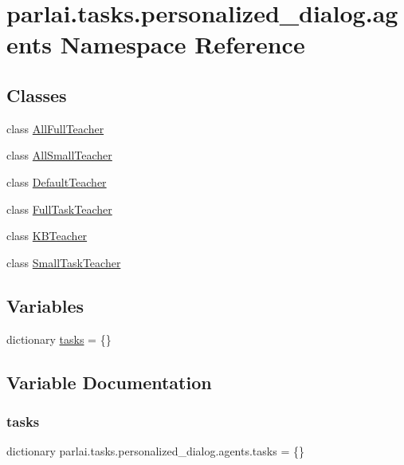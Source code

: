 \hypertarget{namespaceparlai_1_1tasks_1_1personalized__dialog_1_1agents}{}\section{parlai.\+tasks.\+personalized\+\_\+dialog.\+agents Namespace Reference}
\label{namespaceparlai_1_1tasks_1_1personalized__dialog_1_1agents}
\subsection*{Classes}
\begin{DoxyCompactItemize}
\item 
class \hyperlink{classparlai_1_1tasks_1_1personalized__dialog_1_1agents_1_1AllFullTeacher}{All\+Full\+Teacher}
\item 
class \hyperlink{classparlai_1_1tasks_1_1personalized__dialog_1_1agents_1_1AllSmallTeacher}{All\+Small\+Teacher}
\item 
class \hyperlink{classparlai_1_1tasks_1_1personalized__dialog_1_1agents_1_1DefaultTeacher}{Default\+Teacher}
\item 
class \hyperlink{classparlai_1_1tasks_1_1personalized__dialog_1_1agents_1_1FullTaskTeacher}{Full\+Task\+Teacher}
\item 
class \hyperlink{classparlai_1_1tasks_1_1personalized__dialog_1_1agents_1_1KBTeacher}{K\+B\+Teacher}
\item 
class \hyperlink{classparlai_1_1tasks_1_1personalized__dialog_1_1agents_1_1SmallTaskTeacher}{Small\+Task\+Teacher}
\end{DoxyCompactItemize}
\subsection*{Variables}
\begin{DoxyCompactItemize}
\item 
dictionary \hyperlink{namespaceparlai_1_1tasks_1_1personalized__dialog_1_1agents_a8b322496bdc1237209c183f71d5d921c}{tasks} = \{\}
\end{DoxyCompactItemize}


\subsection{Variable Documentation}
\mbox{\label{namespaceparlai_1_1tasks_1_1personalized__dialog_1_1agents_a8b322496bdc1237209c183f71d5d921c}} 
\subsubsection{\texorpdfstring{tasks}{tasks}}
{\footnotesize\ttfamily dictionary parlai.\+tasks.\+personalized\+\_\+dialog.\+agents.\+tasks = \{\}}

